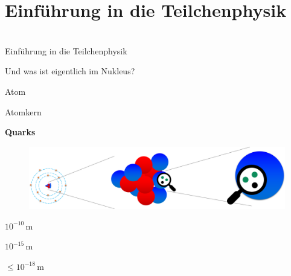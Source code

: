 \section{Einführung in die Teilchenphysik}
\begin{frame}[plain]
   \begin{center} 
  \huge{   }\\
   \Large{Einführung in die Teilchenphysik}
\end{center}
\end{frame}
\begin{frame}[t]{Und was ist eigentlich im Nukleus?}

    \begin{minipage}{\linewidth}
        \begin{minipage}{0.33\linewidth}
             \qquad Atom 
        \end{minipage}     
        \begin{minipage}{0.4\linewidth}
             \quad Atomkern 
        \end{minipage}    
        \begin{minipage}{0.24\linewidth}
            \quad\textbf{Quarks}
        \end{minipage}    
    \end{minipage} \vspace{0.5cm}
    
     \begin{minipage}{0.99\linewidth}
        \begin{figure}
            \centering
            \includegraphics[width=\textwidth]{Figures Introductory Lecture/Standard Model/Scale_Atom_Quark_noText_2.png}
            \label{fig:scale_atom_qaurk}
        \end{figure}
     \end{minipage}  
     \vspace{-15cm}
    \begin{minipage}{\linewidth}
        \begin{minipage}{0.33\linewidth}
            \qquad \Large $10^{-10}$\,m
        \end{minipage}     
        \begin{minipage}{0.33\linewidth}
             \quad \Large $10^{-15}$\,m
        \end{minipage}    
        \begin{minipage}{0.29\linewidth}
            \quad \Large $\leq10^{-18}$\,m
        \end{minipage}    
    \end{minipage}

\end{frame}
